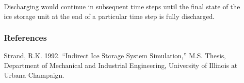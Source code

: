 Discharging would continue in subsequent time steps until the final state of the ice storage unit at the end of a particular time step is fully discharged.

\subsubsection{References}\label{references-1-011}

Strand, R.K. 1992. ``Indirect Ice Storage System Simulation,'' M.S. Thesis, Department of Mechanical and Industrial Engineering, University of Illinois at Urbana-Champaign.
